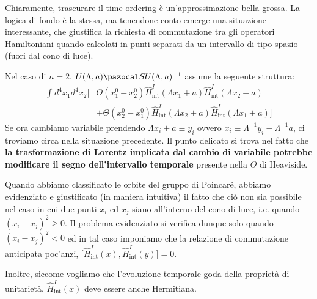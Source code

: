\documentclass[../main.tex]{subfiles}
\begin{document}
Chiaramente, trascurare il time-ordering è un'approssimazione bella grossa. La logica di fondo è la stessa, ma tenendone conto emerge una situazione interessante, che giustifica la richiesta di commutazione tra gli operatori Hamiltoniani quando calcolati in punti separati da un intervallo di tipo spazio (fuori dal cono di luce).

Nel caso di $n=2$, $U(\Lambda, a) \pazocal S U(\Lambda, a)^{-1}$ assume la seguente struttura:
\[
\begin{aligned}
    \int_{}d^4x_1 d^4x_2 \big[&\Theta(x^0_1-x^0_2)\hat{H}^I_\text{int}(\Lambda x_1 + a)\hat{H}^I_\text{int}(\Lambda x_2 + a) \\
    &+ \Theta(x^0_2-x^0_1)\hat{H}^I_\text{int}(\Lambda x_2 + a)\hat{H}^I_\text{int}(\Lambda x_1 + a)\big]
\end{aligned}
\]
Se ora cambiamo variabile prendendo $\Lambda x_i + a \equiv y_i$ ovvero $x_i \equiv \Lambda^{-1}y_i - \Lambda^{-1}a$, ci troviamo circa nella situazione precedente. Il punto delicato si trova nel fatto che \textbf{la trasformazione di Lorentz implicata dal cambio di variabile potrebbe modificare il segno dell'intervallo temporale} presente nella $\Theta$ di Heaviside.

Quando abbiamo classificato le orbite del gruppo di Poincaré, abbiamo evidenziato e giustificato (in maniera intuitiva) il fatto che ciò non sia possibile nel caso in cui due punti $x_i$ ed $x_j$ siano all'interno del cono di luce, i.e. quando $(x_i-x_j)^2\geq 0$. Il problema evidenziato si verifica dunque solo quando $(x_i-x_j)^2< 0$ ed in tal caso imponiamo che la relazione di commutazione anticipata poc'anzi, \(\big[\hat{H}^I_\text{int}(x),\hat{H}^I_\text{int}(y)\big] = 0\).

Inoltre, siccome vogliamo che l'evoluzione temporale goda della proprietà di unitarietà, $\hat{H}^I_\text{int}(x)$ deve essere anche Hermitiana.
\end{document}
